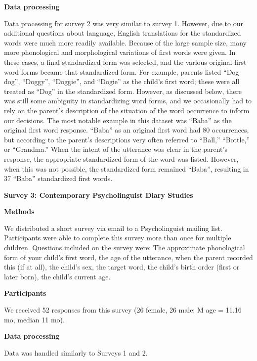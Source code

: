 \documentclass[10pt, a4paper]{article}
\begin{document}
\begin{multicols}{2}
\begin{center} 
\textbf{Data processing}
\end{center}
Data processing for survey 2 was very similar to survey 1. However, due to our additional questions about language, English translations for the standardized words were much more readily available. Because of the large sample size, many more phonological and morphological variations of first words were given. In these cases, a final standardized form was selected, and the various original first word forms became that standardized form. For example, parents listed “Dog dog”, “Doggy”, “Doggie”, and “Dogie” as the child’s first word; these were all treated as “Dog” in the standardized form. However, as discussed below, there was still some ambiguity in standardizing word forms, and we occasionally had to rely on the parent’s description of the situation of the word occurrence to inform our decisions. The most notable example in this dataset was “Baba” as the original first word response. “Baba” as an original first word had 80 occurrences, but according to the parent’s descriptions very often referred to “Ball,” “Bottle,” or “Grandma.” When the intent of the utterance was clear in the parent’s response, the appropriate standardized form of the word was listed. However, when this was not possible, the standardized form remained “Baba”, resulting in 37 “Baba” standardized first words.

\begin{center} 
\textbf{Survey 3: Contemporary Psycholinguist Diary Studies}
\end{center}

\begin{center} 
\textbf{Methods}
\end{center}
We distributed a short survey via email to a Psycholinguist mailing list. Participants were able to complete this survey more than once for multiple children. Questions included on the survey were: The approximate phonological form of your child’s first word, the age of the utterance, when the parent recorded this (if at all), the child’s sex, the target word, the child’s birth order (first or later born), the child’s current age. 

\begin{center} 
\textbf{Participants}
\end{center}
We received 52 responses from this survey (26 female, 26 male; M age = 11.16 mo, median 11 mo). 

\begin{center} 
\textbf{Data processing}
\end{center}
Data was handled similarly to Surveys 1 and 2. 


\end{multicols}
\end{document}
